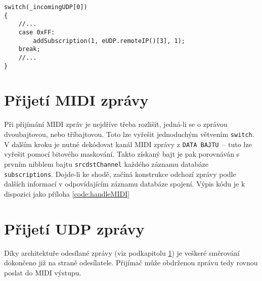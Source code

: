 \begin{lstlisting}
switch(_incomingUDP[0])
{
    //...
    case 0xFF:
        addSubscription(1, eUDP.remoteIP()[3], 1);
    break;
    //...
}
\end{lstlisting}

\section{Přijetí \acs{MIDI} zprávy}\label{chpt:PrijMIDI}
Při přijímání \acs{MIDI} zpráv je nejdříve třeba rozlišit, jedná-li se o zprávou dvoubajtovou, nebo tříbajtovou. Toto lze vyřešit jednoduchým větvením \texttt{switch}. V dalším kroku je nutné dekódovat kanál \acs{MIDI} zprávy z \texttt{DATA BAJTU}~-- tuto  lze vyřešit pomocí bitového maskování. Takto získaný bajt je pak porovnáván s prvním nibblem bajtu \texttt{srcdstChannel} každého záznamu databáze \texttt{sub\-scrip\-tions}. Dojde-li ke shodě, začíná konstrukce odchozí zprávy podle dalších informací v odpovídajícím záznamu databáze spojení. Výpis kódu je k dispozici jako příloha \ref{code:handleMIDI}

\section{Přijetí UDP zprávy}
Díky architektuře odesílané zprávy (viz podkapitolu \ref{chpt:PrijMIDI}) je veškeré směrování dokončeno již na straně odesílatele. Přijímač může obdrženou zprávu tedy rovnou poslat do \acs{MIDI} výstupu.



